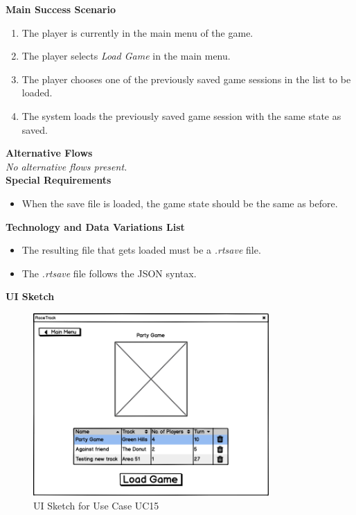 			\textbf{Main Success Scenario}
				\begin{enumerate}
					\item The player is currently in the main menu of the game.
					\item The player selects \textit{Load Game} in the main menu.
					\item The player chooses one of the previously saved game sessions in the list to be loaded.
					\item The system loads the previously saved game session with the same state as saved.
				\end{enumerate}
		
			\textbf{Alternative Flows} \\
				\textit{No alternative flows present.} \\
		
			\textbf{Special Requirements}
				\begin{itemize}
					\item When the save file is loaded, the game state should be the same as before.
				\end{itemize}
		
			\textbf{Technology and Data Variations List}
				\begin{itemize}
					\item The resulting file that gets loaded must be a \textit{.rtsave} file.
					\item The \textit{.rtsave} file follows the JSON syntax.
				\end{itemize}
		
			\newpage

			\textbf{UI Sketch}
				\begin{figure}[H]
					\centering
					\includegraphics[width=9cm,keepaspectratio,center]{img/Use-Case-Model_UC15_UI-Sketch.png}
					\caption{UI Sketch for Use Case UC15}
				\end{figure}

